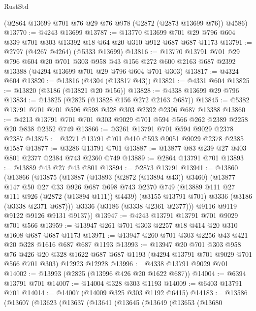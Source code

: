 \begin{lexlean}{RustStd}
\begin{coremodule}
{\begin{coremodule}
{{{{{{{{{{{{{{{{{{{{    (@2864 @13699 @701 @76 @29 @76 @978 (@2872 (@2873 @13699 @76)) @4586)
@13770 := @4243 @13699
@13787 := @13770
    @13699
    @701
    @29
    @796
    @604
    @339
    @701
    @303
    @13392
    @18
    @64
    @20
    @310
    @912
    @687
    @687
    @1173
@13791 := @2797 (@4267 @4264) (@5333 @13699)
@13816 := @13770
    @13791
    @701
    @29
    @796
    @604
    @20
    @701
    @303
    @958
    @43
    @156
    @272
    @600
    @2163
    @687
    @2392
    @13388
    (@4294 @13699 @701 @29 @796 @604 @701 @303)
@13817 := @4324 @604
@13820 := @13816 (@4304 (@13817 @43))
@13821 := @4331 @604
@13825 := @13820 (@3186 (@13821 @20 @156))
@13828 := @4338 @13699 @29 @796
@13834 := @13825 (@2825 (@13828 @156 @272 @2163 @687))
@13845 := @5382 @13791 @701 @701 @596 @598 @328 @303 @2392 @2396 @687 @13388
@13860 := @4213 @13791 @701 @701 @303 @9029 @701 @594 @566 @262 @2389 @2258 @20 @838 @2352 @749
@13866 := @3261 @13791 @701 @594 @9029 @2378 @2387
@13875 := @3271 @13791 @701 @410 @593 @9051 @9029 @2378 @2385 @1587
@13877 := @3286 @13791 @701
@13887 := @13877 @83 @239 @27 @403 @801 @2377 @2384 @743 @2360 @749
@13889 := @2864 @13791 @701
@13893 := @13889 @43 @27 @43 @801
@13894 := @2873 @13791
@13941 := @13860
    (@13866
      (@13875
        (@13887
          (@13893 (@2872 (@13894 @43)) @3460)
          (@13877
            @147
            @50
            @27
            @33
            @926
            @687
            @698
            @743
            @2370
            @749
            (@13889 @111 @27 @111 @926 (@2872 (@13894 @111)) @4439)
            (@3155 @13791 @701)
            @3336
            (@3186 (@3338 @2371 @687)))
          @3336
          (@3186 (@3338 @2361 @2377)))
        @9116
        @9119
        @9122
        @9126
        @9131
        @9137))
@13947 := @4243 @13791 @13791 @701 @9029 @701 @566
@13959 := @13947 @261 @701 @303 @2257 @18 @414 @20 @310 @1608 @687 @687 @1173
@13971 := @13947 @260 @701 @303 @2256 @43 @421 @20 @328 @1616 @687 @687 @1193
@13993 := @13947
    @20
    @701
    @303
    @958
    @76
    @426
    @20
    @328
    @1622
    @687
    @687
    @1193
    (@4294 @13791 @701 @9029 @701 @566 @701 @303)
    @12923
    @12928
@13996 := @4338 @13791 @9029 @701
@14002 := @13993 (@2825 (@13996 @426 @20 @1622 @687))
@14004 := @6394 @13791 @701
@14007 := @14004 @328 @303 @1193
@14009 := @6403 @13791 @701
@14014 := @14007 (@14009 @325 @303 @1192 @6415)
@14183 := @13586
    (@13607
      (@13623
        (@13637
          (@13641
            (@13645
              (@13649
                (@13653
                  (@13680
}}}}}}}}}}}}}}}}}}}}
\end{coremodule}}
\end{coremodule}
\end{lexlean}

